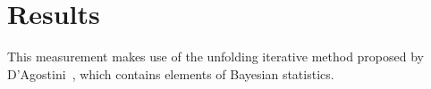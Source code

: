 \documentclass[a4paper]{jpconf}
\begin{document}
\section{Results}

This measurement makes use of the unfolding iterative method proposed by D'Agostini~\cite{bayes-dago-95}, which
contains elements of Bayesian statistics.

\end{document}
